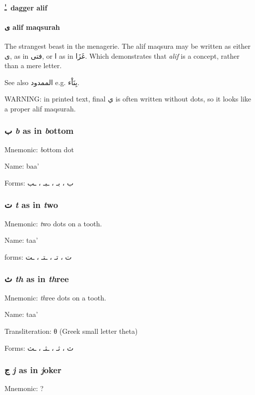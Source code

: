 \documentclass[11pt]{article}
\begin{document}
\paragraph{\textarabic{ـٰ}\  dagger alif}
\paragraph{\textarabic{ى} alif maqsurah}

The strangest beast in the menagerie. The alif maqsura may be written
as either \textarabic{ى}, as in \textarabic{فتى}, or \textarabic{ا} as
in \textarabic{غَزَا}. Which demonstrates that \textit{alif} is a
concept, rather than a mere letter.

See also \textarabic{الممدود} e.g. \textarabic{بِنَاْء}.

WARNING: in printed text, final \textarabic{ي} is often written
without dots, so it looks like a proper alif maqsurah.



\subsubsection{ \textarabic{ب}  \textit{b} as in \textit{b}ottom}
Mnemonic: \textit{b}ottom dot

\noindent Name: baa'

\noindent Forms: \textarabic{ب ، بـ ، ـبـ ، ـب}


\subsubsection{ \textarabic{ت} \textit{t} as in \textit{t}wo}
Mnemonic: \textit{t}wo dots on a tooth.

\noindent Name: taa'

\noindent forms: \textarabic{ت ، تـ ، ـتـ ، ـت}

\subsubsection{ \textarabic{ث} \textit{th} as in \textit{th}ree}
Mnemonic:  \textit{th}ree dots on a tooth.

\noindent Name: taa'

\noindent Transliteration: θ (Greek small letter theta)

\noindent Forms: \textarabic{ث ، ثـ ، ـثـ ، ـث}

\subsubsection{ \textarabic{ج} \textit{j} as in \textit{j}oker}
Mnemonic:  ?
\end{document}
